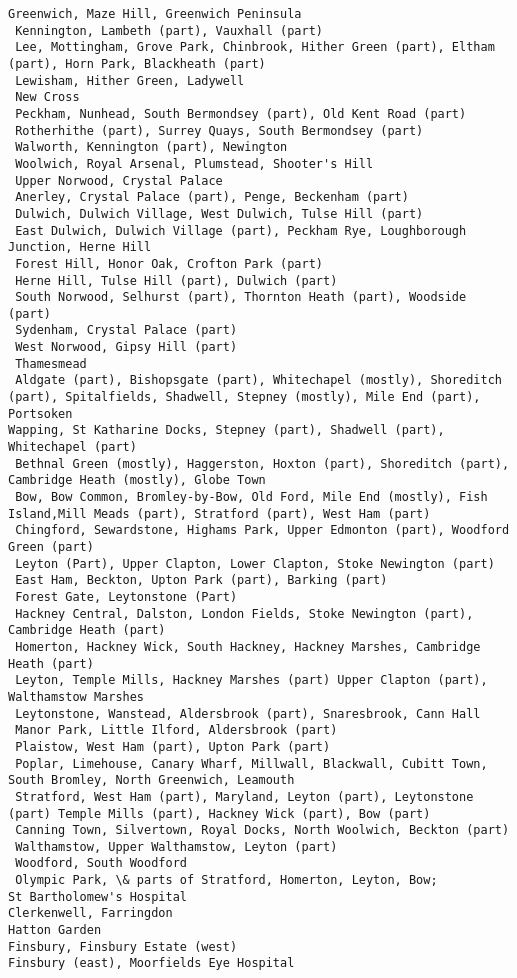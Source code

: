 \documentclass[11pt]{article}
\begin{document}
\begin{Verbatim}[commandchars=\\\{\}]
 Greenwich, Maze Hill, Greenwich Peninsula
 Kennington, Lambeth (part), Vauxhall (part)
 Lee, Mottingham, Grove Park, Chinbrook, Hither Green (part), Eltham (part), Horn Park, Blackheath (part)
 Lewisham, Hither Green, Ladywell
 New Cross
 Peckham, Nunhead, South Bermondsey (part), Old Kent Road (part)
 Rotherhithe (part), Surrey Quays, South Bermondsey (part)
 Walworth, Kennington (part), Newington
 Woolwich, Royal Arsenal, Plumstead, Shooter's Hill
 Upper Norwood, Crystal Palace
 Anerley, Crystal Palace (part), Penge, Beckenham (part)
 Dulwich, Dulwich Village, West Dulwich, Tulse Hill (part)
 East Dulwich, Dulwich Village (part), Peckham Rye, Loughborough Junction, Herne Hill
 Forest Hill, Honor Oak, Crofton Park (part)
 Herne Hill, Tulse Hill (part), Dulwich (part)
 South Norwood, Selhurst (part), Thornton Heath (part), Woodside (part)
 Sydenham, Crystal Palace (part)
 West Norwood, Gipsy Hill (part)
 Thamesmead
 Aldgate (part), Bishopsgate (part), Whitechapel (mostly), Shoreditch (part), Spitalfields, Shadwell, Stepney (mostly), Mile End (part), Portsoken
Wapping, St Katharine Docks, Stepney (part), Shadwell (part), Whitechapel (part)
 Bethnal Green (mostly), Haggerston, Hoxton (part), Shoreditch (part), Cambridge Heath (mostly), Globe Town
 Bow, Bow Common, Bromley-by-Bow, Old Ford, Mile End (mostly), Fish Island,Mill Meads (part), Stratford (part), West Ham (part)
 Chingford, Sewardstone, Highams Park, Upper Edmonton (part), Woodford Green (part)
 Leyton (Part), Upper Clapton, Lower Clapton, Stoke Newington (part)
 East Ham, Beckton, Upton Park (part), Barking (part)
 Forest Gate, Leytonstone (Part)
 Hackney Central, Dalston, London Fields, Stoke Newington (part), Cambridge Heath (part)
 Homerton, Hackney Wick, South Hackney, Hackney Marshes, Cambridge Heath (part)
 Leyton, Temple Mills, Hackney Marshes (part) Upper Clapton (part), Walthamstow Marshes
 Leytonstone, Wanstead, Aldersbrook (part), Snaresbrook, Cann Hall
 Manor Park, Little Ilford, Aldersbrook (part)
 Plaistow, West Ham (part), Upton Park (part)
 Poplar, Limehouse, Canary Wharf, Millwall, Blackwall, Cubitt Town, South Bromley, North Greenwich, Leamouth
 Stratford, West Ham (part), Maryland, Leyton (part), Leytonstone (part) Temple Mills (part), Hackney Wick (part), Bow (part)
 Canning Town, Silvertown, Royal Docks, North Woolwich, Beckton (part)
 Walthamstow, Upper Walthamstow, Leyton (part)
 Woodford, South Woodford
 Olympic Park, \& parts of Stratford, Homerton, Leyton, Bow;
St Bartholomew's Hospital
Clerkenwell, Farringdon
Hatton Garden
Finsbury, Finsbury Estate (west)
Finsbury (east), Moorfields Eye Hospital

\end{Verbatim}
\end{document}
